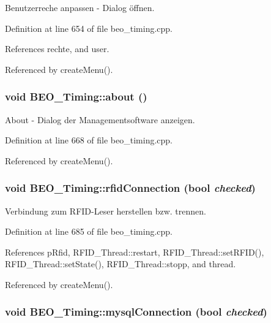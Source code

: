 Benutzerreche anpassen - Dialog öffnen. 



Definition at line 654 of file beo\_\-timing.cpp.

References rechte, and user.

Referenced by createMenu().\hypertarget{class_b_e_o___timing_2f021b28df0eb948aa69146ab5631c02}{
\subsubsection[about]{\setlength{\rightskip}{0pt plus 5cm}void BEO\_\-Timing::about ()}}
\label{class_b_e_o___timing_2f021b28df0eb948aa69146ab5631c02}


About - Dialog der Managementsoftware anzeigen. 



Definition at line 668 of file beo\_\-timing.cpp.

Referenced by createMenu().\hypertarget{class_b_e_o___timing_d303ff34c6d33593cb57e1fc1881d991}{
\subsubsection[rfidConnection]{\setlength{\rightskip}{0pt plus 5cm}void BEO\_\-Timing::rfidConnection (bool {\em checked})}}
\label{class_b_e_o___timing_d303ff34c6d33593cb57e1fc1881d991}


Verbindung zum RFID-Leser herstellen bzw. trennen. 



Definition at line 685 of file beo\_\-timing.cpp.

References pRfid, RFID\_\-Thread::restart, RFID\_\-Thread::setRFID(), RFID\_\-Thread::setState(), RFID\_\-Thread::stopp, and thread.

Referenced by createMenu().\hypertarget{class_b_e_o___timing_42c6266466562efb8e012cc0389767b7}{
\subsubsection[mysqlConnection]{\setlength{\rightskip}{0pt plus 5cm}void BEO\_\-Timing::mysqlConnection (bool {\em checked})}}
\label{class_b_e_o___timing_42c6266466562efb8e012cc0389767b7}


